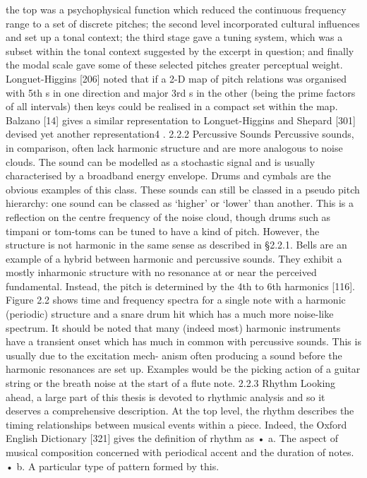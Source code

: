 the top was a psychophysical function which reduced the continuous frequency range to a set
of discrete pitches; the second level incorporated cultural influences and set up a tonal context;
the third stage gave a tuning system, which was a subset within the tonal context suggested by
the excerpt in question; and finally the modal scale gave some of these selected pitches greater
perceptual weight.
Longuet-Higgins [206] noted that if a 2-D map of pitch relations was organised with 5th s
in one direction and major 3rd s in the other (being the prime factors of all intervals) then keys
could be realised in a compact set within the map. Balzano [14] gives a similar representation to
Longuet-Higgins and Shepard [301] devised yet another representation4 .
2.2.2 Percussive Sounds
Percussive sounds, in comparison, often lack harmonic structure and are more analogous to
noise clouds. The sound can be modelled as a stochastic signal and is usually characterised by a
broadband energy envelope. Drums and cymbals are the obvious examples of this class. These
sounds can still be classed in a pseudo pitch hierarchy: one sound can be classed as ‘higher’ or
‘lower’ than another. This is a reflection on the centre frequency of the noise cloud, though drums
such as timpani or tom-toms can be tuned to have a kind of pitch. However, the structure is not
harmonic in the same sense as described in §2.2.1. Bells are an example of a hybrid between
harmonic and percussive sounds. They exhibit a mostly inharmonic structure with no resonance
at or near the perceived fundamental. Instead, the pitch is determined by the 4th to 6th harmonics
[116]. Figure 2.2 shows time and frequency spectra for a single note with a harmonic (periodic)
structure and a snare drum hit which has a much more noise-like spectrum.
It should be noted that many (indeed most) harmonic instruments have a transient onset
which has much in common with percussive sounds. This is usually due to the excitation mech-
anism often producing a sound before the harmonic resonances are set up. Examples would be
the picking action of a guitar string or the breath noise at the start of a flute note.
2.2.3 Rhythm
Looking ahead, a large part of this thesis is devoted to rhythmic analysis and so it deserves
a comprehensive description. At the top level, the rhythm describes the timing relationships
between musical events within a piece. Indeed, the Oxford English Dictionary [321] gives the
definition of rhythm as
• a. The aspect of musical composition concerned with periodical accent and the duration of
notes.
• b. A particular type of pattern formed by this.
